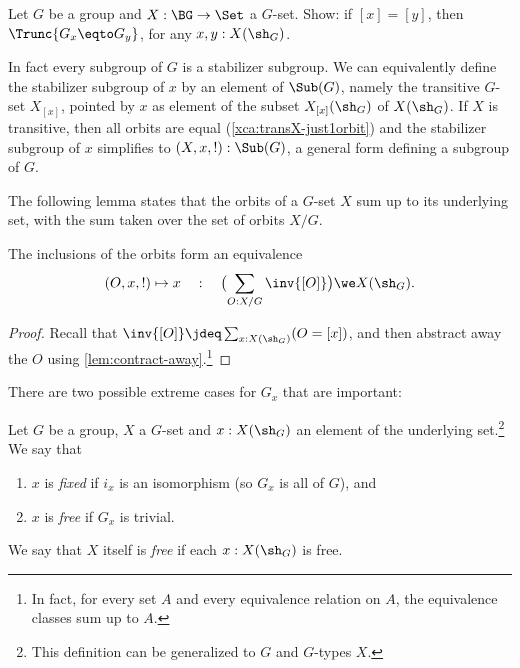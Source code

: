 \begin{xca}\label{xca:[x]=[y]-implies-||Gx=Gy||}
Let $G$ be a group and $X: \BG\to\Set$ a $G$-set. Show:
if $[x]=[y]$, then $\Trunc{G_x\eqto G_y}$, for any $x,y:X(\sh_G)$.
\end{xca}

\begin{remark}\label{rem:subgrp-is-stabsubgr}
  In fact every subgroup of $G$ is a stabilizer subgroup.
  We can equivalently define the stabilizer subgroup of $x$ 
  by an element of $\Sub(G)$, namely
  the transitive $G$-set $X_{[x]}$, pointed by
  $x$ as element of the subset $X_{[x]}(\sh_G)$ of $X(\sh_G)$.
  If $X$ is transitive, then all orbits are equal (\cref{xca:transX-just1orbit})
  and the stabilizer subgroup of $x$ simplifies to $(X,x,!):\Sub(G)$,
  a general form defining a subgroup of $G$.
\end{remark}

The following lemma states that the orbits of a $G$-set $X$
sum up to its underlying set, with the sum taken over the set
of orbits $X/G$.

\begin{lemma}
  \label{lem:splitting into orbits}
  The inclusions of the orbits form an equivalence
\[
  (O,x,!)\mapsto x \quad:\quad
  \bigl(\sum_{O:X/G} \inv{[O]} \bigr) \we X(\sh_G).
\]
\end{lemma}
\begin{proof}
Recall that $\inv{[O]}\jdeq \sum_{x:X(\sh_G)}(O=[x])$, 
and then abstract
away the $O$ using \cref{lem:contract-away}.\footnote{%
In fact, for every set $A$ and every equivalence relation on $A$,
the equivalence classes sum up to $A$.}
\end{proof}

There are two possible extreme cases for $G_x$ that are important:
\begin{definition}\label{def:fixed-free}
  Let $G$ be a group, $X$ a $G$-set and $x:X(\sh_G)$ an element of the underlying set.\footnote{%
  This definition can be generalized to \inftygps $G$ and $G$-types $X$.}
  We say that
  \begin{enumerate}
  \item $x$ is \emph{fixed}
    if $i_x$ is an isomorphism (so $G_x$ is all of $G$), and
  \item $x$ is \emph{free}
    if $G_x$ is trivial.
  \end{enumerate}
  We say that $X$ itself is \emph{free} if each $x:X(\sh_G)$ is free.
\end{definition}

